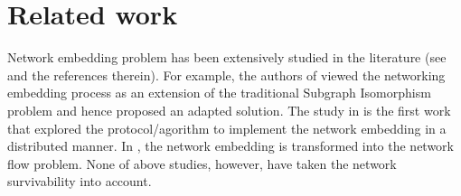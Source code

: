 \section{Related work}
\label{sec:relatedWork}
Network embedding problem has been extensively studied in the literature\cite{fischer2013virtual} (see \cite{lischka2009virtual,houidi2008distributed,chowdhury2009virtual} and the references therein). For example, the authors of \cite{lischka2009virtual} viewed the networking embedding process as an extension of the traditional Subgraph Isomorphism problem and hence proposed an adapted solution. The study in \cite{houidi2008distributed} is the first work that explored the protocol/agorithm to implement the network embedding in a distributed manner. In \cite{chowdhury2009virtual}, the network embedding is transformed into the network flow problem. None of above studies, however, have taken the network survivability into
account.


